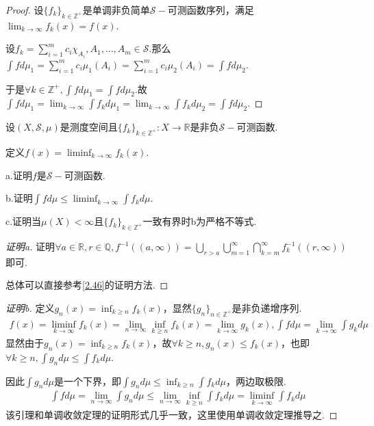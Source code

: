 \begin{proof}
    设\(\{f_k\}_{k \in \mathbb{Z}^+}\)是单调非负简单\(\mathcal{S}-\)可测函数序列，满足\(\lim_{k \to \infty}f_k(x)=f(x)\).

    设\(f_k=\sum_{i=1}^m c_i\chi_{A_i}, A_1, \dots, A_m \in \mathcal{S}\).那么\(\int f d\mu_1=\sum_{i=1}^m c_i\mu_1(A_i)=\sum_{i=1}^m c_i\mu_2(A_i)=\int f d\mu_2\).

    于是\(\forall k \in \mathbb{Z}^+, \int f d\mu_1=\int f d\mu_2\).故\(\int f d\mu_1=\lim_{k \to \infty} \int f_k d\mu_1=\lim_{k \to \infty} \int f_k d\mu_2=\int f d\mu_2\).
\end{proof}

\newpage

\begin{problem}[17]\label{3.A.17}
    设\((X, \mathcal{S}, \mu)\)是测度空间且\(\{f_k\}_{k \in \mathbb{Z}^+}: X \to \mathbb{R}\)是非负\(\mathcal{S}-\)可测函数.

    定义\(f(x)=\liminf_{k \to \infty}f_k(x)\).
    
    a.证明\(f\)是\(\mathcal{S}-\)可测函数.

    b.证明\(\int f d\mu \leq \liminf_{k \to \infty} \int f_k d\mu\).

    c.证明当\(\mu(X)<\infty\)且\(\{f_k\}_{k \in \mathbb{Z}^+}\)一致有界时b为严格不等式.
\end{problem}

\begin{proof}[证明a]
    证明\(\forall a \in \mathbb{R}, r \in \mathbb{Q}, f^{-1}((a,\infty))=\bigcup_{r>a} \bigcup_{m=1}^\infty \bigcap_{k=m}^\infty f_k^{-1}((r,\infty))\)即可.

    {\kaishu 总体可以直接参考\cref{2.46}的证明方法.}
\end{proof}

\begin{proof}[证明b]
    定义\(g_n(x)=\inf_{k \geq n} f_k(x)\)，显然\(\{g_n\}_{n \in \mathbb{Z}^+}\)是非负递增序列.
    \begin{align*}
        f(x)=\liminf_{k \to \infty}f_k(x)=\lim_{n \to \infty} \inf_{k \geq n} f_k(x)=\lim_{k \to \infty}g_k(x), 
        \int f d\mu=\lim_{k \to \infty} \int g_k d\mu
    \end{align*}
    显然由于\(g_n(x)=\inf_{k \geq n} f_k(x)\)，故\(\forall k \geq n, g_n(x) \leq f_k(x)\)，也即\(\forall k \geq n, \int g_n d\mu \leq \int f_k d\mu\).

    因此\(\int g_n d\mu\)是一个下界，即\(\int g_n d\mu \leq \inf_{k \geq n} \int f_k d\mu\)，两边取极限.
    \begin{align*}
        \int f d\mu=\lim_{n \to \infty} \int g_n d\mu \leq \lim_{n \to \infty} \inf_{k \geq n} \int f_k d\mu
        =\liminf_{k \to \infty} \int f_k d\mu
    \end{align*}
    {\kaishu 该引理和单调收敛定理的证明形式几乎一致，这里使用单调收敛定理推导之.}
\end{proof}

